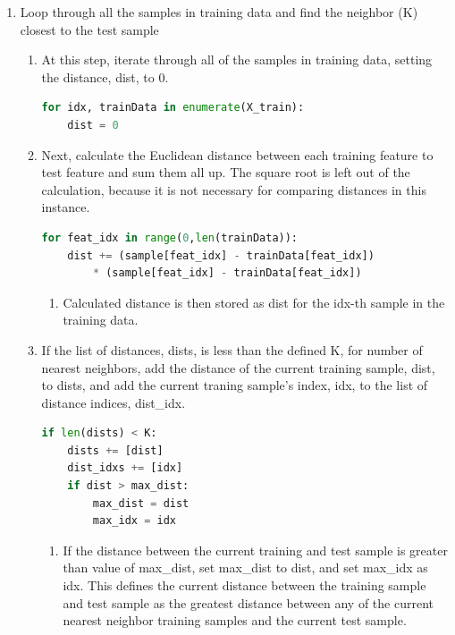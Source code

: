 \documentclass[11pt]{article}
\theoremstyle{definition}
\begin{document}
\begin{enumerate}
\begin{enumerate}
 \item Loop through all the samples in training data and find the neighbor (\textsf{K}) closest to the test sample
 \begin{enumerate}
     \item At this step, iterate through all of the samples in training data, setting the distance, \textsf{dist}, to 0.
\begin{lstlisting}[language=python, frame=single]
for idx, trainData in enumerate(X_train):
    dist = 0
\end{lstlisting}
     \item Next, calculate the Euclidean distance between each training feature to test feature and sum them all up. The square root is left out of the calculation, because it is not necessary for comparing distances in this instance. 
\begin{lstlisting}[language=python, frame=single]
for feat_idx in range(0,len(trainData)):
    dist += (sample[feat_idx] - trainData[feat_idx]) 
        * (sample[feat_idx] - trainData[feat_idx])
\end{lstlisting}
     \begin{enumerate}
     \item Calculated distance is then stored as \textsf{dist} for the \textsf{idx}-th sample in the training data.
     \end{enumerate}
    \item If the list of distances, \textsf{dists}, is less than the defined \textsf{K}, for number of nearest neighbors, add the distance of the current training sample, \textsf{dist}, to \textsf{dists}, and add the current traning sample's index, \textsf{idx}, to the list of distance indices, \textsf{dist\_idx}.
\begin{lstlisting}[language=python, frame=single]
if len(dists) < K:
    dists += [dist]
    dist_idxs += [idx]
    if dist > max_dist:
        max_dist = dist
        max_idx = idx
\end{lstlisting}
    \begin{enumerate}
        \item If the distance between the current training and test sample is greater than value of \textsf{max\_dist}, set \textsf{max\_dist} to \textsf{dist}, and set \textsf{max\_idx} as \textsf{idx}. This defines the current distance between the training sample and test sample as the greatest distance between any of the current nearest neighbor training samples and the current test sample.
    \end{enumerate}

\end{enumerate}
\end{enumerate}
\end{enumerate}
\end{document}
